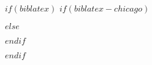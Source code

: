 
$if(biblatex)$
$if(biblatex-chicago)$
\usepackage[$if(biblio-style)$$biblio-style$,$endif$$for(biblatexoptions)$$biblatexoptions$$sep$,$endfor$]{biblatex-chicago}
$else$
\usepackage[$if(biblio-style)$style=$biblio-style$,$endif$$for(biblatexoptions)$$biblatexoptions$$sep$,$endfor$]{biblatex}
$endif$

\setlength\bibitemsep{0pt}  %
\renewcommand*{\bibfont}{\footnotesize}  %
\setlength\bibhang{\parindent}  %



$endif$